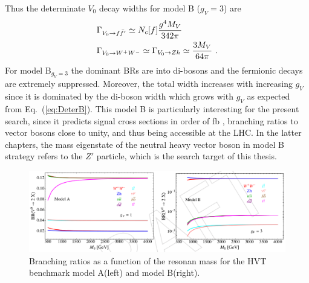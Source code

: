 Thus the determinate $V_{0}$ decay widths for model B ($g_{V}=3$) are
\begin{align}
  &\Gamma_{V_{0}\rightarrow f\bar{f}'}\simeq N_{c}[f]\frac{g^{4}M_{V}}{342\pi}\nonumber\\
  &\Gamma_{V_{0}\rightarrow W^{+}W^{-}}\simeq \Gamma_{V_{0}\rightarrow Zh}\simeq \frac{3M_{V}}{64\pi}\textup{ .}
\end{align}
For model B$_{g_{V}=3}$ the dominant BRs are into di-bosons and the fermionic decays are extremely suppressed. Moreover, the total width increases with increasing $g_{V}$ since it is dominated by the di-boson width which grows with $g_{V}$ as expected from Eq.~({\ref{eq:DeterB}}). This model B is particularly interesting for the present search, since it predicts signal cross sections in order of fb\cite{HVT} \cite{CMS_AN_2015-186}, branching ratios to vector bosons close to unity, and thus being accessible at the LHC. In the latter chapters, the mass eigenstate of the neutral heavy vector boson in model B strategy refers to the $Z'$ particle, which is the search target of this thesis.\\
\begin{figure}[h]
  \begin{center}
    \includegraphics[width=\textwidth]{figure/CH1/BRs_modelAvsB.png}
  \end{center}
  \caption{\label{fig:BRs_AvsB}Branching ratios as a function of the resonan mass for the HVT benchmark model A(left) and model B(right).}
\end{figure}
